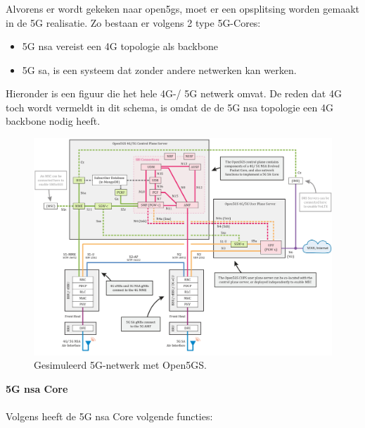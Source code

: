 \subsubsection{}
\label{sec:open5gs}

Alvorens er wordt gekeken naar \gls{open5gs}, moet er een opsplitsing worden gemaakt in de 5G realisatie.
Zo bestaan er volgens \textcite{Lee2025a} 2 type 5G-Cores:

\begin{itemize}
  \item 5G \gls{nsa} vereist een 4G topologie als backbone
  \item 5G \gls{sa}, is een systeem dat zonder andere netwerken kan werken.
\end{itemize}

Hieronder is een figuur die het hele 4G-/ 5G netwerk omvat. De reden dat 4G toch wordt vermeldt in dit schema, is omdat de de 5G \gls{nsa} topologie een 4G backbone nodig heeft. \autocite{Lee2025a}

\begin{figure}[H]
  \includegraphics[width=\linewidth]{../graphics/Open5GS-Schema.jpg}
  \caption{Gesimuleerd 5G-netwerk met Open5GS. \autocite[Door][Copyright 2021 van \citeauthor{Lee2021}]{Lee2021}}
  \label{fig:open5gs-schema}
\end{figure}

\textbf{5G \gls{nsa} Core}\\\\
Volgens \textcite{Lee2025a} heeft de 5G \gls{nsa} Core volgende functies:

